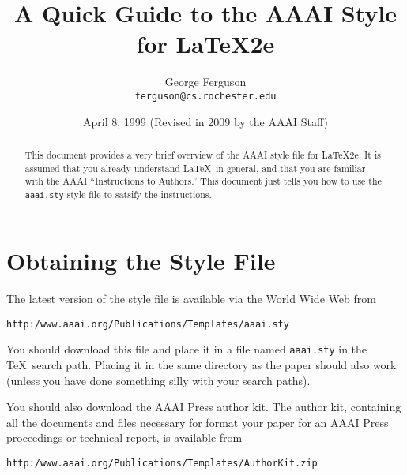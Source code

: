 \documentclass{article}
\begin{document}
\title{A Quick Guide to the AAAI Style for \LaTeX2e}
\author{George Ferguson \\ \texttt{ferguson@cs.rochester.edu}} 
\date{April 8, 1999 (Revised in  2009 by the AAAI Staff)}
\maketitle
\begin{abstract}
\noindent This document provides a very brief overview of the AAAI style file
for \LaTeX2e. It is assumed that you already understand \LaTeX\ in
general, and that you are familiar with the AAAI ``Instructions to
Authors.'' This document just tells you how to use the
\verb+aaai.sty+ style file to satsify the instructions.
\end{abstract}
\section{Obtaining the Style File}
The latest version of the style file is available via the World Wide
Web from
\begin{verbatim}
http:/www.aaai.org/Publications/Templates/aaai.sty
\end{verbatim}
You should download this file and place it in a file named
\verb+aaai.sty+ in the \TeX\ search path. Placing it in the same
directory as the paper should also work (unless you have done
something silly with your search paths).

You should also download the AAAI Press author kit. The author kit, containing all the documents and files necessary for format your paper for an AAAI Press proceedings or technical report,
is available from
\begin{verbatim}
http:/www.aaai.org/Publications/Templates/AuthorKit.zip
\end{verbatim}
\end{document}

